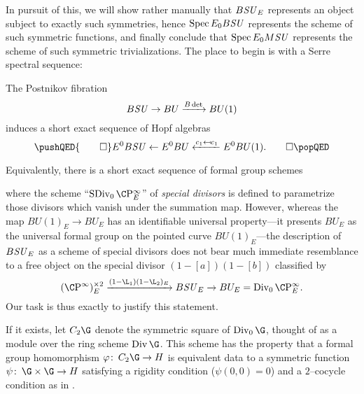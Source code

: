 \noindent In pursuit of this, we will show rather manually that \(B\mathit{SU}_E\) represents an object subject to exactly such symmetries, hence \(\operatorname{Spec} E_0 B\mathit{SU}\) represents the scheme of such symmetric functions, and finally conclude that \(\operatorname{Spec} E_0 M\mathit{SU}\) represents the scheme of such symmetric trivializations.  The place to begin is with a Serre spectral sequence:
\begin{lemma}\label{BSUtoBUtoCPinftyIsSexseq}
The Postnikov fibration \[B\mathit{SU} \to BU \xrightarrow{B\det} BU(1)\] induces a short exact sequence of Hopf algebras
\[\pushQED{\qed}
E^0 B\SU \from E^0 BU \xleftarrow{c_1 \mapsfrom c_1} E^0 BU(1). \qedhere
\popQED\]
\end{lemma}

\noindent Equivalently, there is a short exact sequence of formal group schemes
\begin{center}
\end{center}
where the scheme ``\(\SDiv_0 \CP^\infty_E\)'' of \textit{special divisors} is defined to parametrize those divisors which vanish under the summation map.  However, whereas the map \(BU(1)_E \to BU_E\) has an identifiable universal property---it presents \(BU_E\) as the universal formal group on the pointed curve \(BU(1)_E\)---the description of \(B\mathit{SU}_E\) as a scheme of special divisors does not bear much immediate resemblance to a free object on the special divisor \((1 - [a])(1 - [b])\) classified by \[(\CP^\infty)^{\times 2}_E \xrightarrow{(1 - \L_1)(1 - \L_2)_E} B\SU_E \to BU_E = \Div_0 \CP^\infty_E.\]  Our task is thus exactly to justify this statement.

\begin{definition}\label{DefinitionOfC2G}
If it exists, let \(C_2 \G\) denote the symmetric square of \(\Div_0 \G\), thought of as a module over the ring scheme \(\Div \G\).  This scheme has the property that a formal group homomorphism \(\phi\co C_2 \G \to H\) is equivalent data to a symmetric function \(\psi\co \G \times \G \to H\) satisfying a rigidity condition (\(\psi(0, 0) = 0\)) and a \(2\)--cocycle condition as in .
\end{definition}

